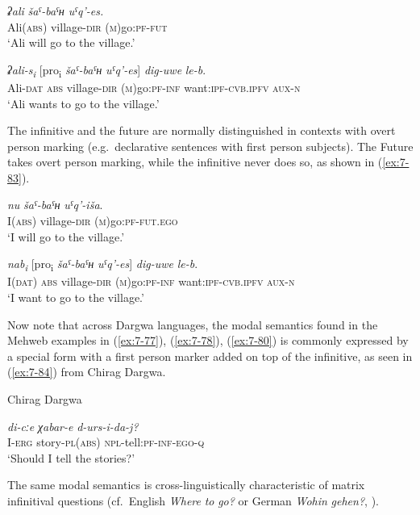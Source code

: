 ﻿\documentclass[output=paper]{langsci/langscibook}
\begin{document}
\ea\label{ex:7-82}
\ea %
\gll \emph{ʡali} \emph{šaˤ-baˤʜ} \emph{uˤq'-es.}\\
Ali(\textsc{abs}) village-\textsc{dir} (\textsc{m})go:\textsc{pf}-\textsc{fut}\\
\glt `Ali will go to the village.'

\ex %
\gll \emph{ʡali-s\textsubscript{i}} [pro\textsubscript{i} \emph{šaˤ-baˤʜ} \emph{uˤq'-es}] \emph{dig-uwe} \emph{le-b}.\\
Ali-\textsc{dat} \textsc{abs} village-\textsc{dir} (\textsc{m})go:\textsc{pf}-\textsc{inf}
want:\textsc{ipf}-\textsc{cvb.ipfv} \textsc{aux}-\textsc{n}\\
\glt `Ali wants to go to the village.'
\z
\z

The infinitive and the future are normally distinguished in contexts
with overt person marking (e.g.\ declarative sentences with first person
subjects). The Future takes overt person marking, while the
infinitive never does so, as shown in (\ref{ex:7-83}).

\ea \label{ex:7-83}
\ea %
\gll \emph{nu} \emph{šaˤ-baˤʜ} \emph{uˤq'-iša}.\\
I(\textsc{abs}) village-\textsc{dir} (\textsc{m})go:\textsc{pf}-\textsc{fut}.\textsc{ego}\\
\glt `I will go to the village.'

\ex %
\gll \emph{nab\textsubscript{i}} [pro\textsubscript{i} \emph{šaˤ-baˤʜ} \emph{uˤq'-es}] \emph{dig-uwe} \emph{le-b}.\\
I(\textsc{dat}) \textsc{abs} village-\textsc{dir} (\textsc{m})go:\textsc{pf}-\textsc{inf} want:\textsc{ipf}-\textsc{cvb.ipfv} \textsc{aux}-\textsc{n}\\
\glt `I want to go to the village.'
\z
\z

Now note that across Dargwa languages, the modal semantics
found in the Mehweb examples in (\ref{ex:7-77}), (\ref{ex:7-78}), (\ref{ex:7-80}) is commonly expressed
by a special form with a first person marker added on top of the
infinitive, as seen in (\ref{ex:7-84}) from Chirag Dargwa.

\ea\label{ex:7-84}
Chirag Dargwa

\gll \emph{di-cːe} \emph{χabar-e} \emph{d-urs-i-da-j?}\\
I-\textsc{erg} story-\textsc{pl}(\textsc{abs}) \textsc{npl}-tell:\textsc{pf}-\textsc{inf}-\textsc{ego}-\textsc{q}\\
\glt `Should I tell the stories?'
\z

The same modal semantics is cross-linguistically characteristic of
matrix infinitival questions (cf.\ English \emph{Where} \emph{to} \emph{go?} or German
\emph{Wohin} \emph{gehen?}, \citealt[108, 110]{bhatt2006}).
\end{document}
